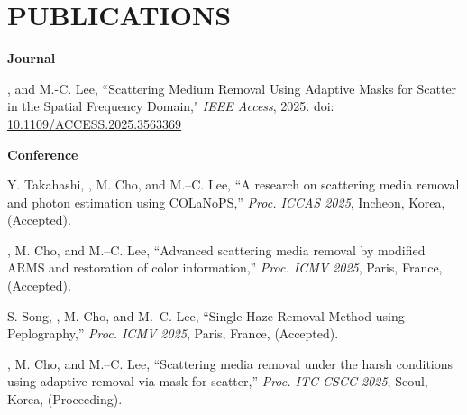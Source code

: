 \documentclass[a4paper,9pt]{extarticle}
\begin{document}
\section*{PUBLICATIONS}

\noindent
\textbf{Journal}
\begin{enumerate}[label={[\arabic*]}, start=1]
    \item 
    , and M.-C. Lee,
    ``Scattering Medium Removal Using Adaptive Masks for Scatter in the Spatial Frequency Domain," 
    \textit{IEEE Access},
    2025.
    doi: \href{https://doi.org/10.1109/ACCESS.2025.3563369}{10.1109/ACCESS.2025.3563369}
\end{enumerate} 

\noindent
\textbf{Conference}
\begin{enumerate}[label={[\arabic*]}, start=1]
    \item 
    Y. Takahashi, , M. Cho, and M.--C. Lee, 
    ``A research on scattering media removal and photon estimation using COLaNoPS,''
    \textit{Proc. ICCAS 2025}, 
    Incheon, Korea,
    (Accepted).

    \item 
    , M. Cho, and M.--C. Lee, 
    ``Advanced scattering media removal by modified ARMS and restoration of color information,'' 
    \textit{Proc. ICMV 2025},
    Paris, France,
    (Accepted).
        
    \item 
    S. Song, , M. Cho, and M.--C. Lee, 
    ``Single Haze Removal Method using Peplography,'' 
    \textit{Proc. ICMV 2025},
    Paris, France,
    (Accepted).

    \item 
    , M. Cho, and M.--C. Lee, 
    ``Scattering media removal under the harsh conditions using adaptive removal via mask for scatter,'' 
    \textit{Proc. ITC-CSCC 2025},
    Seoul, Korea, 
    (Proceeding).
    

\end{enumerate}
\end{document}
